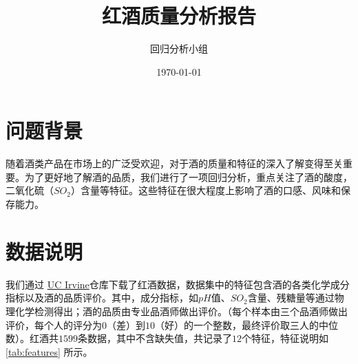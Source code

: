 \documentclass[fontset=ubuntu]{ctexart}
\title{红酒质量分析报告}
\author{回归分析小组}
\date{\today}
\begin{document}
    \maketitle
    \thispagestyle{empty}
    \newpage

    \tableofcontents
    \thispagestyle{empty}
    \newpage
    \setcounter{page}{1} %

    \section{问题背景}
        随着酒类产品在市场上的广泛受欢迎，对于酒的质量和特征的深入了解变得至关重要。为了更好地了解酒的品质，我们进行了一项回归分析，重点关注了酒的酸度，二氧化硫（$SO_2$）含量等特征。这些特征在很大程度上影响了酒的口感、风味和保存能力。 

    \section{数据说明}
        我们通过 \href{https://archive.ics.uci.edu/dataset/186/wine+quality}{UC Irvine}仓库下载了红酒数据，数据集中的特征包含酒的各类化学成分指标以及酒的品质评价。其中，成分指标，如$pH$值、$SO_2$含量、残糖量等通过物理化学检测得出；酒的品质由专业品酒师做出评价。（每个样本由三个品酒师做出评价，每个人的评分为$0$（差）到$10$（好）的一个整数，最终评价取三人的中位数）。红酒共$1599$条数据，其中不含缺失值，共记录了$12$个特征，特征说明如 \ref{tab:features} 所示。
\end{document}
